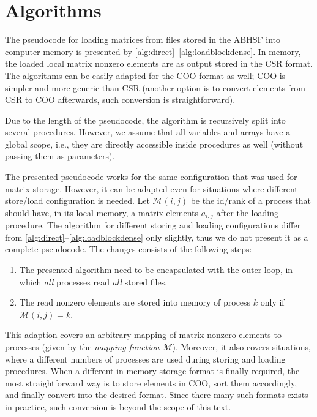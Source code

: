 \documentclass[10pt,a4paper]{article}
\begin{document}
\section{Algorithms}

The pseudocode for loading matrices from files stored in the ABHSF into computer memory is presented by \autoref{alg:direct}--\ref{alg:loadblockdense}. In memory, the loaded local matrix nonzero elements are as output stored in the CSR format. The algorithms can be easily adapted for the COO format as well; COO is simpler and more generic than CSR (another option is to convert elements from CSR to COO afterwards, such conversion is straightforward). 

Due to the length of the pseudocode, the algorithm is recursively split into several procedures. However, we assume that all variables and arrays have a global scope, i.e., they are directly accessible inside procedures as well (without passing them as parameters).

The presented pseudocode works for the same configuration that was used for matrix storage. However, it can be adapted even for situations where different store/load configuration is needed. Let $\mathcal{M}(i,j)$ be the id/rank of a process that should have, in its local memory, a matrix elements $a_{i,j}$ after the loading procedure. The algorithm for different storing and loading configurations differ from \autoref{alg:direct}--\ref{alg:loadblockdense} only slightly, thus we do not present it as a complete pseudocode. The changes consists of the following steps:
\begin{enumerate}
\item The presented algorithm need to be encapsulated with the outer loop, in which \emph{all} processes read \emph{all} stored files.
\item The read nonzero elements are stored into memory of process $k$ only if $\mathcal{M}(i,j)=k$.
\end{enumerate}

This adaption covers an arbitrary mapping of matrix nonzero elements to processes (given by the \emph{mapping function} $\mathcal{M}$). Moreover, it also covers situations, where a different numbers of processes are used during storing and loading procedures. When a different in-memory storage format is finally required, the most straightforward way is to store elements in COO, sort them accordingly, and finally convert into the desired format. Since there many such formats exists in practice, such conversion is beyond the scope of this text.
\end{document}

